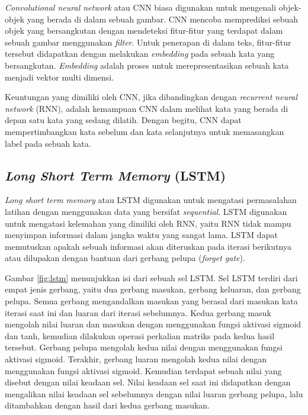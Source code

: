 \textit{Convolutional neural network} atau CNN biasa digunakan untuk mengenali objek-objek yang berada di dalam sebuah gambar. CNN mencoba memprediksi sebuah objek yang bersangkutan dengan mendeteksi fitur-fitur yang terdapat dalam sebuah gambar menggunakan \textit{filter}. Untuk penerapan di dalam teks, fitur-fitur tersebut didapatkan dengan melakukan \textit{embedding} pada sebuah kata yang bersangkutan. \textit{Embedding} adalah proses untuk merepresentasikan sebuah kata menjadi vektor multi dimensi.

Keuntungan yang dimiliki oleh CNN, jika dibandingkan dengan \textit{recurrent neural network} (RNN), adalah kemampuan CNN dalam melihat kata yang berada di depan satu kata yang sedang dilatih. Dengan begitu, CNN dapat mempertimbangkan kata sebelum dan kata selanjutnya untuk memasangkan label pada sebuah kata.

\subsection{\textit{Long Short Term Memory} (LSTM)}

\textit{Long short term memory} atau LSTM digunakan untuk mengatasi permasalahan latihan dengan menggunakan data yang bersifat \textit{sequential}. LSTM digunakan untuk mengatasi kelemahan yang dimiliki oleh RNN, yaitu RNN tidak mampu menyimpan informasi dalam jangka waktu yang sangat lama. LSTM dapat memutuskan apakah sebuah informasi akan diteruskan pada iterasi berikutnya atau dilupakan dengan bantuan dari gerbang pelupa (\textit{forget gate}).

Gambar \ref{fig:lstm} menunjukkan isi dari sebuah sel LSTM. Sel LSTM terdiri dari empat jenis gerbang, yaitu dua gerbang masukan, gerbang keluaran, dan gerbang pelupa. Semua gerbang mengandalkan masukan yang berasal dari masukan kata iterasi saat ini dan luaran dari iterasi sebelumnya. Kedua gerbang masuk mengolah nilai luaran dan masukan dengan menggunakan fungsi aktivasi sigmoid dan tanh, kemudian dilakukan operasi perkalian matriks pada kedua hasil tersebut. Gerbang pelupa mengolah kedua nilai dengan menggunakan fungsi aktivasi sigmoid. Terakhir, gerbang luaran mengolah kedua nilai dengan menggunakan fungsi aktivasi sigmoid. Kemudian terdapat sebuah nilai yang disebut dengan nilai keadaan sel. Nilai keadaan sel saat ini didapatkan dengan mengalikan nilai keadaan sel sebelumnya dengan nilai luaran gerbang pelupa, lalu ditambahkan dengan hasil dari kedua gerbang masukan.

